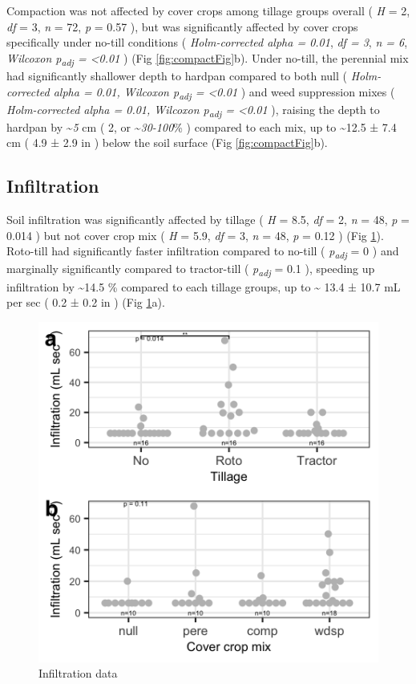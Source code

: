 \documentclass[
]{article}
\begin{document}
Compaction was not affected by cover crops among tillage groups overall (
\emph{H} = 2,
\emph{df} = 3,
\emph{n} = 72,
\emph{p} = 0.57
), but was significantly affected by cover crops specifically under no-till conditions (
\emph{Holm-corrected alpha = 0.01},
\emph{df = 3},
\emph{n = 6},
\emph{Wilcoxon p\textsubscript{adj} = \textless0.01}
) (Fig \ref{fig:compactFig}b).
Under no-till, the perennial mix had significantly shallower depth to hardpan compared to both null (
\emph{Holm-corrected alpha = 0.01, Wilcoxon p\textsubscript{adj} = \textless0.01}
) and weed suppression mixes (
\emph{Holm-corrected alpha = 0.01, Wilcoxon p\textsubscript{adj} = \textless0.01}
),
raising the depth to hardpan by
\textasciitilde{}\emph{5} cm (
2, or
\textasciitilde{}\emph{30-100}\%
) compared to each mix,
up to
\textasciitilde12.5 ±
7.4 cm
(
4.9 ±
2.9 in
) below the soil surface
(Fig \ref{fig:compactFig}b).

\hypertarget{infiltration-1}{%
\subsection{Infiltration}\label{infiltration-1}}

Soil infiltration was significantly affected by tillage (
\emph{H} = 8.5,
\emph{df} = 2,
\emph{n} = 48,
\emph{p} = 0.014
) but not cover crop mix (
\emph{H} = 5.9,
\emph{df} = 3,
\emph{n} = 48,
\emph{p} = 0.12
) (Fig \ref{fig:infilFig}).
Roto-till had significantly faster infiltration compared to no-till (
\emph{p\textsubscript{adj}} = 0
) and marginally significantly compared to tractor-till (
\emph{p\textsubscript{adj}} = 0.1
), speeding up infiltration by
\textasciitilde14.5 \%
compared to each tillage groups,
up to
\textasciitilde{} 13.4 ±
10.7 mL per sec
(
0.2 ±
0.2 in
)
(Fig \ref{fig:infilFig}a).

\begin{figure}
\includegraphics[width=12.5in]{../figs/infilPlot} \caption{Infiltration data}\label{fig:infilFig}
\end{figure}
\end{document}
